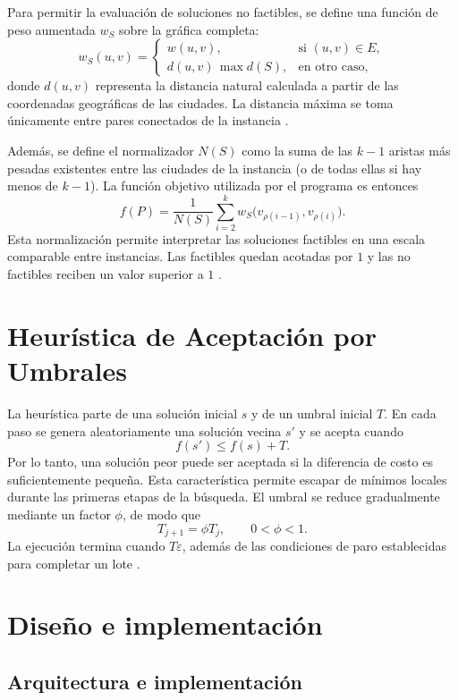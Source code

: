 \documentclass[11pt,a4paper]{article}
\begin{document}
Para permitir la evaluación de soluciones no factibles, se define una
función de peso aumentada $w_S$ sobre la gráfica completa:
\[
w_S(u,v)=
\begin{cases}
 w(u,v), & \text{si }(u,v)\in E,\\[4pt] d(u,v)\,\max d(S), & \text{en
   otro caso},
\end{cases}
\]
donde $d(u,v)$ representa la distancia natural calculada a partir de
las coordenadas geográficas de las ciudades. La distancia máxima se
toma únicamente entre pares conectados de la instancia
\cite{materialTsp}.

Además, se define el normalizador $N(S)$ como la suma de las $k-1$
aristas más pesadas existentes entre las ciudades de la instancia (o
de todas ellas si hay menos de $k-1$). La función objetivo utilizada
por el programa es entonces
\[
f(P)=\frac{1}{N(S)}\sum_{i=2}^{k}
w_S\bigl(v_{\rho(i-1)},v_{\rho(i)}\bigr).
\]
Esta normalización permite interpretar las soluciones factibles en una
escala comparable entre instancias. Las factibles quedan acotadas por
$1$ y las no factibles reciben un valor superior a $1$
\cite{materialTsp}.

\section{Heurística de Aceptación por Umbrales}

La heurística parte de una solución inicial $s$ y de un umbral inicial $T$. En cada paso se genera aleatoriamente una solución vecina $s'$ y se acepta cuando
\[
f(s')\leq f(s)+T.
\]
Por lo tanto, una solución peor puede ser aceptada si la diferencia de costo es suficientemente pequeña. Esta característica permite escapar de mínimos locales durante las primeras etapas de la búsqueda. El umbral se reduce gradualmente mediante un factor $\phi$, de modo que
\[
T_{j+1}=\phi T_j,\qquad 0<\phi<1.
\]
La ejecución termina cuando $T \varepsilon$, además de las condiciones de paro establecidas para completar un lote \cite{materialThreshold}.


\section{Diseño e implementación}



\subsection{Arquitectura e implementación}
\end{document}
